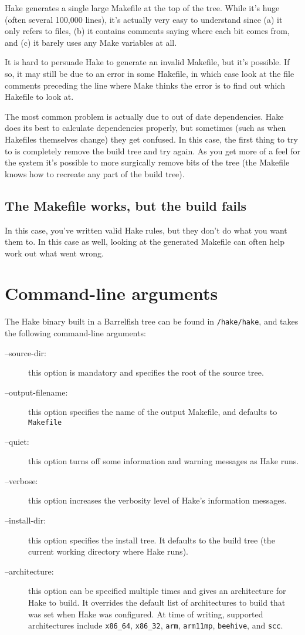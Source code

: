 \documentclass[a4paper,twoside]{report} %
\begin{document}
Hake generates a single large Makefile at the top of the tree.
While it's huge (often several 100,000 lines), it's actually very easy to
understand 
since (a) it only refers to files, (b) it contains comments saying
where each bit comes from, and (c) it barely uses any
Make variables at all.  

It is hard to persuade Hake to generate an invalid Makefile,
but it's possible.  If so, it may still be due to an error in some
Hakefile, in which case look at the file comments preceding the line
where Make thinks the error is to find out which Hakefile to look
at. 

The most common problem is actually due to out of date dependencies.
Hake does its best to calculate dependencies properly, but sometimes
(such as when Hakefiles themselves change) they get confused.  In this
case, the first thing to try to is completely remove the build tree
and try again.  As you get more of a feel for the system it's possible
to more surgically remove bits of the tree (the Makefile knows how to
recreate any part of the build tree). 

\section{The Makefile works, but the build fails}

In this case, you've written valid Hake rules, but they don't do what
you want them to.  In this case as well, looking at the generated Makefile
can often help work out what went wrong. 

\chapter{Command-line arguments}

The Hake binary built in a Barrelfish tree can be found in
\texttt{/hake/hake}, and takes the following command-line arguments:
\begin{description}
\item[--source-dir:] this option is mandatory and specifies the root
  of the source tree. 
\item[--output-filename:] this option specifies the name of the output
  Makefile, and defaults to \texttt{Makefile}
\item[--quiet:] this option turns off some information and warning
  messages as Hake runs.
\item[--verbose:] this option increases the verbosity level of Hake's
  information messages.
\item[--install-dir:] this option specifies the install tree.  It
  defaults to the build tree (the current working directory where Hake runs).
\item[--architecture:] this option can be specified multiple times and
  gives an architecture for Hake to build.  It overrides the default
  list of architectures to build that was set when Hake was
  configured.  At time of writing, supported architectures include
  \texttt{x86\_64}, \texttt{x86\_32}, \texttt{arm}, \texttt{arm11mp},
  \texttt{beehive}, and \texttt{scc}. 
\end{description}
\end{document}
